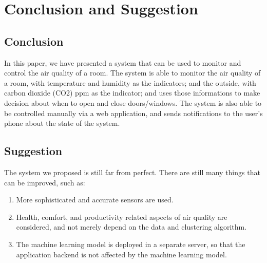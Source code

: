 \section{Conclusion and Suggestion}

\subsection{Conclusion}
In this paper, we have presented a system that can be
used to monitor and control the air quality of a room.
The system is able to monitor the air quality of a room,
with temperature and humidity as the indicators; and
the outside, with carbon dioxide (CO2) ppm as the indicator;
and uses those informations to make decision about when to
open and close doors/windows.
The system is also able to be controlled manually via a web
application, and sends notifications to the user's phone
about the state of the system.

\subsection{Suggestion}
The system we proposed is still far from perfect.
There are still many things that can be improved, such as:
\begin{enumerate}
      \item More sophisticated and accurate sensors are
            used.
      \item Health, comfort, and productivity related
            aspects of air quality are considered,
            and not merely depend on the data and
            clustering algorithm.
      \item The machine learning model is deployed
            in a separate server, so that the
            application backend is not affected
            by the machine learning model.
\end{enumerate}
